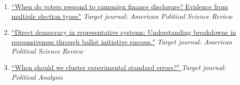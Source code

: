 \documentclass[11pt, a4paper]{article}
\begin{document}
\begin{enumerate}

\item \href{https://ts-robinson.com/publication/robinson-whenvotersrespond-2020/robinson-whenvotersrespond-2020.pdf}{``When do voters respond to campaign finance disclosure? Evidence from multiple election types"} \textit{Target journal: American Political Science Review}

\item \href{https://ts-robinson.com/publication/robinson-directdemocracyrepresentative-2020/robinson-directdemocracyrepresentative-2020.pdf}{``Direct democracy in representative systems: Understanding breakdowns in responsiveness through ballot initiative success."} \textit{Target journal: American Political Science Review}


\item \href{https://ts-robinson.com/publication/robinson-whenshouldwe-2020/robinson-whenshouldwe-2020.pdf}{``When should we cluster experimental standard errors?" } \textit{Target journal: Political Analysis}

\end{enumerate}
\end{document}
